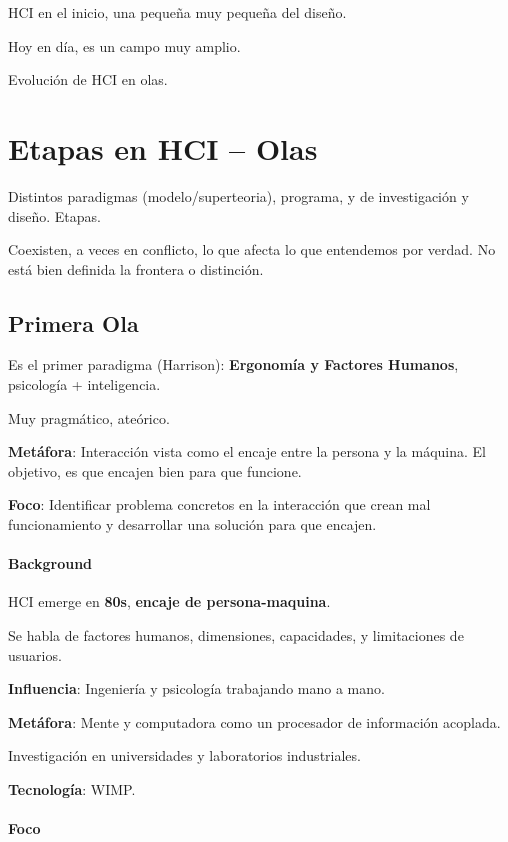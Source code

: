 \documentclass[12pt]{report} %
\begin{document}
HCI en el inicio, una pequeña muy pequeña del diseño.

Hoy en día, es un campo muy amplio.

Evolución de HCI en olas.

\section{Etapas en HCI -- Olas}

Distintos paradigmas (modelo/superteoria), programa, y de investigación
y diseño. Etapas.

Coexisten, a veces en conflicto, lo que afecta lo que entendemos por
verdad. No está bien definida la frontera o distinción.

\subsection{Primera Ola}

Es el primer paradigma (Harrison): \textbf{Ergonomía y Factores
Humanos}, psicología + inteligencia.

Muy pragmático, ateórico.

\textbf{Metáfora}: Interacción vista como el encaje entre la persona y
la máquina. El objetivo, es que encajen bien para que funcione.

\textbf{Foco}: Identificar problema concretos en la interacción que
crean mal funcionamiento y desarrollar una solución para que encajen.

\hypertarget{background}{%
\paragraph{Background}\label{background}}

HCI emerge en \textbf{80s}, \textbf{encaje de persona-maquina}.

Se habla de factores humanos, dimensiones, capacidades, y limitaciones
de usuarios.

\textbf{Influencia}: Ingeniería y psicología trabajando mano a mano.

\textbf{Metáfora}: Mente y computadora como un procesador de información
acoplada.

Investigación en universidades y laboratorios industriales.

\textbf{Tecnología}: WIMP.

\hypertarget{foco}{%
\paragraph{Foco}\label{foco}}
\end{document}
